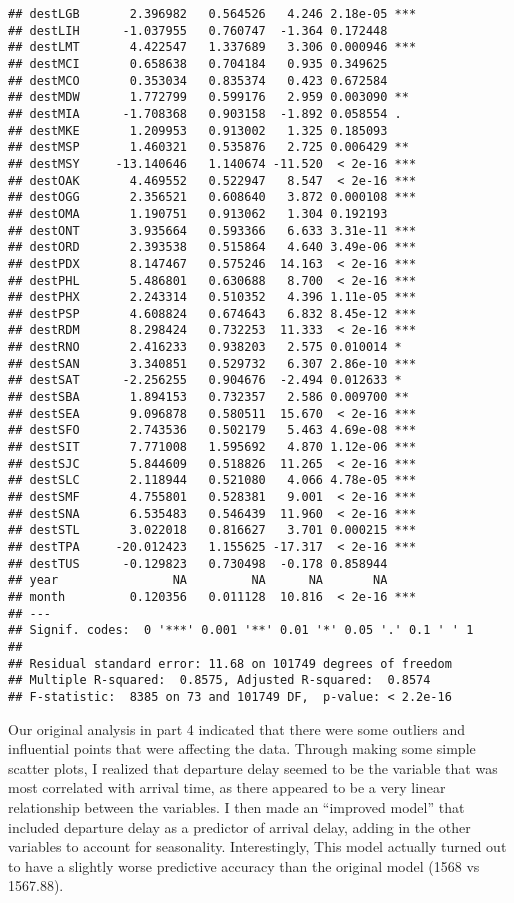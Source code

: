 \documentclass[
]{article}
\begin{document}
\begin{verbatim}
## destLGB       2.396982   0.564526   4.246 2.18e-05 ***
## destLIH      -1.037955   0.760747  -1.364 0.172448    
## destLMT       4.422547   1.337689   3.306 0.000946 ***
## destMCI       0.658638   0.704184   0.935 0.349625    
## destMCO       0.353034   0.835374   0.423 0.672584    
## destMDW       1.772799   0.599176   2.959 0.003090 ** 
## destMIA      -1.708368   0.903158  -1.892 0.058554 .  
## destMKE       1.209953   0.913002   1.325 0.185093    
## destMSP       1.460321   0.535876   2.725 0.006429 ** 
## destMSY     -13.140646   1.140674 -11.520  < 2e-16 ***
## destOAK       4.469552   0.522947   8.547  < 2e-16 ***
## destOGG       2.356521   0.608640   3.872 0.000108 ***
## destOMA       1.190751   0.913062   1.304 0.192193    
## destONT       3.935664   0.593366   6.633 3.31e-11 ***
## destORD       2.393538   0.515864   4.640 3.49e-06 ***
## destPDX       8.147467   0.575246  14.163  < 2e-16 ***
## destPHL       5.486801   0.630688   8.700  < 2e-16 ***
## destPHX       2.243314   0.510352   4.396 1.11e-05 ***
## destPSP       4.608824   0.674643   6.832 8.45e-12 ***
## destRDM       8.298424   0.732253  11.333  < 2e-16 ***
## destRNO       2.416233   0.938203   2.575 0.010014 *  
## destSAN       3.340851   0.529732   6.307 2.86e-10 ***
## destSAT      -2.256255   0.904676  -2.494 0.012633 *  
## destSBA       1.894153   0.732357   2.586 0.009700 ** 
## destSEA       9.096878   0.580511  15.670  < 2e-16 ***
## destSFO       2.743536   0.502179   5.463 4.69e-08 ***
## destSIT       7.771008   1.595692   4.870 1.12e-06 ***
## destSJC       5.844609   0.518826  11.265  < 2e-16 ***
## destSLC       2.118944   0.521080   4.066 4.78e-05 ***
## destSMF       4.755801   0.528381   9.001  < 2e-16 ***
## destSNA       6.535483   0.546439  11.960  < 2e-16 ***
## destSTL       3.022018   0.816627   3.701 0.000215 ***
## destTPA     -20.012423   1.155625 -17.317  < 2e-16 ***
## destTUS      -0.129823   0.730498  -0.178 0.858944    
## year                NA         NA      NA       NA    
## month         0.120356   0.011128  10.816  < 2e-16 ***
## ---
## Signif. codes:  0 '***' 0.001 '**' 0.01 '*' 0.05 '.' 0.1 ' ' 1
## 
## Residual standard error: 11.68 on 101749 degrees of freedom
## Multiple R-squared:  0.8575, Adjusted R-squared:  0.8574 
## F-statistic:  8385 on 73 and 101749 DF,  p-value: < 2.2e-16
\end{verbatim}

Our original analysis in part 4 indicated that there were some outliers
and influential points that were affecting the data. Through making some
simple scatter plots, I realized that departure delay seemed to be the
variable that was most correlated with arrival time, as there appeared
to be a very linear relationship between the variables. I then made an
``improved model'' that included departure delay as a predictor of
arrival delay, adding in the other variables to account for seasonality.
Interestingly, This model actually turned out to have a slightly worse
predictive accuracy than the original model (1568 vs 1567.88).
\end{document}
